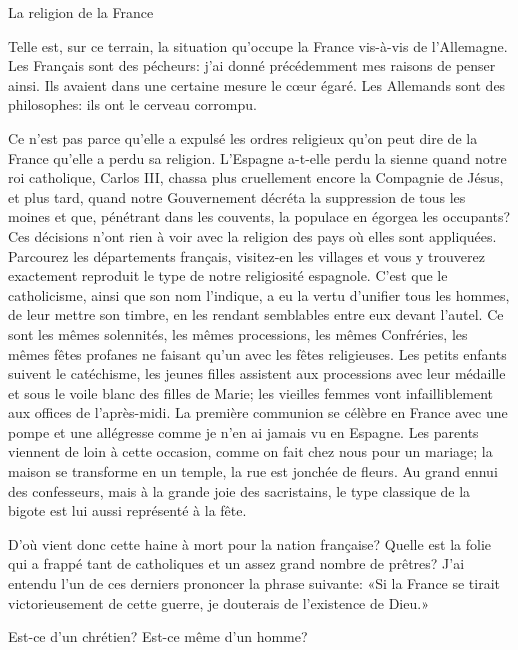 \begin{chapter}{La religion de la France}
\horizontalLine

Telle est, sur ce terrain, la situation qu'occupe la France vis-à-vis de
l'Allemagne. Les Français sont des pécheurs: j'ai donné précédemment mes
raisons de penser ainsi. Ils avaient dans une certaine mesure le cœur
égaré. Les Allemands sont des philosophes: ils ont le cerveau corrompu.

Ce n'est pas parce qu'elle a expulsé les ordres religieux qu'on peut
dire de la France qu'elle a perdu sa religion. L'Espagne a-t-elle perdu
la sienne quand notre roi catholique, Carlos III, chassa plus
cruellement encore la Compagnie de Jésus, et plus tard, quand notre
Gouvernement décréta la suppression de tous les moines et que,
pénétrant dans les couvents, la populace en égorgea les occupants? Ces
décisions n'ont rien à voir avec la religion des pays où elles sont
appliquées. Parcourez les départements français, visitez-en les villages
et vous y trouverez exactement reproduit le type de notre religiosité
espagnole. C'est que le catholicisme, ainsi que son nom l'indique, a eu
la vertu d'unifier tous les hommes, de leur mettre son timbre, en les
rendant semblables entre eux devant l'autel. Ce sont les mêmes
solennités, les mêmes processions, les mêmes Confréries, les mêmes fêtes
profanes ne faisant qu'un avec les fêtes religieuses. Les petits enfants
suivent le catéchisme, les jeunes filles assistent aux processions avec
leur médaille et sous le voile blanc des filles de Marie; les vieilles
femmes vont infailliblement aux offices de l'après-midi. La première
communion se célèbre en France avec une pompe et une allégresse comme
je n'en ai jamais vu en Espagne. Les parents viennent de loin à cette
occasion, comme on fait chez nous pour un mariage; la maison se
transforme en un temple, la rue est jonchée de fleurs. Au grand ennui
des confesseurs, mais à la grande joie des sacristains, le type
classique de la bigote est lui aussi représenté à la fête.

D'où vient donc cette haine à mort pour la nation française? Quelle est
la folie qui a frappé tant de catholiques et un assez grand nombre de
prêtres? J'ai entendu l'un de ces derniers prononcer la phrase suivante:
«Si la France se tirait victorieusement de cette guerre, je douterais de
l'existence de Dieu.»

Est-ce d'un chrétien? Est-ce même d'un homme?


\end{chapter}
